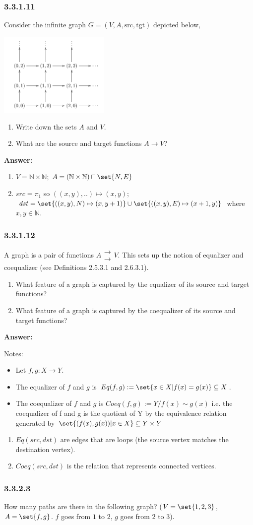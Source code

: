 \documentclass{article}
\newcommand{\N}{\mathbb{N}}
\newcommand{\vsp}[0]{\vspace*{10pt}\par}
\newcommand{\exercise}[1]{\subsubsection*{#1}}
\newcommand{\ans}[0]{\vsp\textbf{Answer: }\vsp}
\newcommand{\toto}[0]{\begin{array}{c}\rightarrow \\[-1.9ex]\rightarrow\end{array}}
\newcommand{\ei}{\item}
\newcommand{\es}{\begin{enumerate}[label=(\alph*)]\ei}
\newcommand{\ee}{\end{enumerate}}
\newcommand{\ls}{\begin{itemize}\item}
\newcommand{\li}{\item}
\renewcommand{\le}{\end{itemize}}
\begin{document}
\exercise{3.3.1.11}

Consider the infinite graph $G = (V, A, \text{src}, \text{tgt})$ depicted below,

\begin{center}
\includegraphics[width=0.4\textwidth]{img/ex33111.png}
\end{center}

\es Write down the sets $A$ and $V$.
\ei What are the source and target functions $A \to V$?
\ee

\ans

\es $V = \N \times \N$; $A = (\N \times \N) \sqcap \set{N,E}$
\ei $src = \pi_1$ so $((x,y),..) \mapsto (x,y)$;
    $dst = \set{ ((x,y),N) \mapsto (x,y+1)} \cup \set{ ((x,y),E) \mapsto
    (x+1,y)}$ where $x,y \in \N$.
\ee

\exercise{3.3.1.12}

A graph is a pair of functions $A \toto V$. This sets up the notion of
equalizer and coequalizer (see Definitions 2.5.3.1 and 2.6.3.1).

\es What feature of a graph is captured by the equalizer of its source and
    target functions?
\ei What feature of a graph is captured by the coequalizer of its source and
    target functions?
\ee


\ans

Notes:

\ls Let $f,g: X \to Y$.

\li The equalizer of $f$ and $g$ is $Eq(f,g) := \set{x \in X | f(x) = g(x)}
    \subseteq X$.

\li The coequalizer of $f$ and $g$ is $Coeq(f,g) := Y / f(x) \sim
    g(x)$ i.e.  the coequalizer of f and g is the quotient of Y by the
    equivalence relation generated by $\set{(f(x),g(x)) | x \in X} \subseteq Y
    \times Y$
\le

\es $Eq(src,dst)$ are edges that are loops (the source vertex matches the
    destination vertex).
\ei $Coeq(src,dst)$ is the relation that represents connected vertices.
\ee

\exercise{3.3.2.3}

How many paths are there in the following graph? ($V=\set{1,2,3}$,
$A=\set{f,g}$. $f$ goes from $1$ to $2$, $g$ goes from $2$ to $3$).
\end{document}
